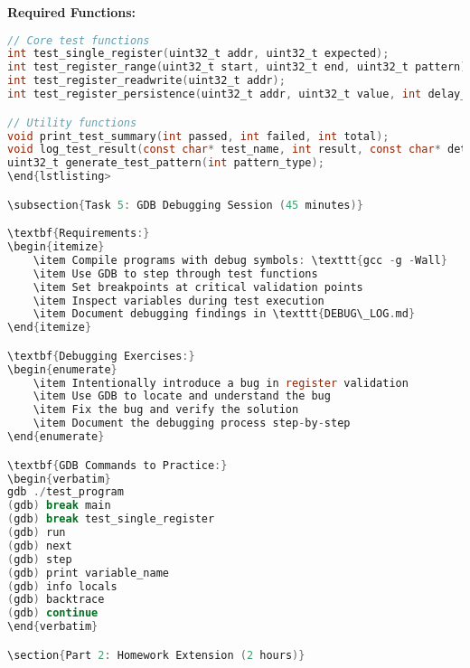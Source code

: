 \documentclass[11pt,a4paper]{article}
\begin{document}
\textbf{Required Functions:}
\begin{lstlisting}[language=C]
// Core test functions
int test_single_register(uint32_t addr, uint32_t expected);
int test_register_range(uint32_t start, uint32_t end, uint32_t pattern);
int test_register_readwrite(uint32_t addr);
int test_register_persistence(uint32_t addr, uint32_t value, int delay_ms);

// Utility functions
void print_test_summary(int passed, int failed, int total);
void log_test_result(const char* test_name, int result, const char* details);
uint32_t generate_test_pattern(int pattern_type);
\end{lstlisting>

\subsection{Task 5: GDB Debugging Session (45 minutes)}

\textbf{Requirements:}
\begin{itemize}
    \item Compile programs with debug symbols: \texttt{gcc -g -Wall}
    \item Use GDB to step through test functions
    \item Set breakpoints at critical validation points
    \item Inspect variables during test execution
    \item Document debugging findings in \texttt{DEBUG\_LOG.md}
\end{itemize}

\textbf{Debugging Exercises:}
\begin{enumerate}
    \item Intentionally introduce a bug in register validation
    \item Use GDB to locate and understand the bug
    \item Fix the bug and verify the solution
    \item Document the debugging process step-by-step
\end{enumerate}

\textbf{GDB Commands to Practice:}
\begin{verbatim}
gdb ./test_program
(gdb) break main
(gdb) break test_single_register
(gdb) run
(gdb) next
(gdb) step
(gdb) print variable_name
(gdb) info locals
(gdb) backtrace
(gdb) continue
\end{verbatim}

\section{Part 2: Homework Extension (2 hours)}


\end{lstlisting}
\end{document}
